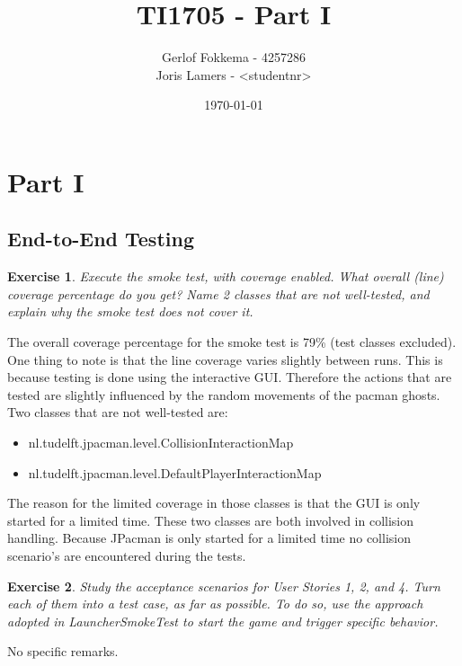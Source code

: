 \documentclass[a4paper]{article}
\title{TI1705 - Part I}
\author{Gerlof Fokkema - 4257286\\
		Joris Lamers - \textless studentnr\textgreater}
\date{\today}
\newtheorem{thm}{Exercise}
\begin{document}
  \maketitle
  \section{Part I}
  
  \subsection{End-to-End Testing}
    \begin{thm}
      Execute the smoke test, with coverage enabled. What overall (line) coverage percentage do you get? Name 2 classes that are not well-tested, and explain why the smoke test does not cover it.
    \end{thm}    
    The overall coverage percentage for the smoke test is 79\% (test classes excluded). \\
    One thing to note is that the line coverage varies slightly between runs. This is because testing is done using the interactive GUI. Therefore the actions that are tested are slightly influenced by the random movements of the pacman ghosts. \\
    Two classes that are not well-tested are:
    \begin{itemize}
      \item nl.tudelft.jpacman.level.CollisionInteractionMap
      \item nl.tudelft.jpacman.level.DefaultPlayerInteractionMap
    \end{itemize}
    The reason for the limited coverage in those classes is that the GUI is only started for a limited time. These two classes are both involved in collision handling. Because JPacman is only started for a limited time no collision scenario's are encountered during the tests.


    \begin{thm}
      Study the acceptance scenarios for User Stories 1, 2, and 4. Turn each of them into a test case, as far as possible. To do so, use the approach adopted in LauncherSmokeTest to start the game and trigger specific behavior.
    \end{thm}
    No specific remarks.
\end{document}
